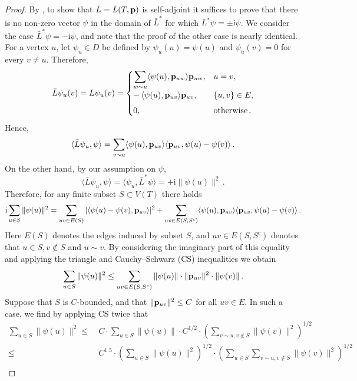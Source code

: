\documentclass[10pt,a4paper]{amsart}
\numberwithin{equation}{section}
\newcommand{\ii}{\mathrm{i}}
\newcommand{\p}{{\bf p}}
\begin{document}
\begin{proof}
    By \cite[Theorem VIII.3]{ReedSimonI}, to show that $\bar L=\bar L(T,\p)$ is self-adjoint it suffices to prove that there is no non-zero vector $\psi$ in the domain of $\bar L^*$ for which $L^*\psi=\pm \ii\psi$. We consider the case $\bar L^*\psi=-\ii\psi$, and note that the proof of the other case is nearly identical. For a vertex $u$, let $\psi_u\in D$ be defined by $\psi_u(u)=\psi(u)$ and $\psi_u(v)=0$ for every $v\ne u$. Therefore,
    \[
        \bar L\psi_u(v) = L\psi_u(v) =
        \begin{cases}
        \displaystyle \sum_{w\sim u} \langle \psi(u),\p_{uw}\rangle\p_{uw}, & u=v,\\[1ex]
        \displaystyle -\,\langle \psi(u),\p_{uv}\rangle\p_{uv}, & \{u,v\}\in E,\\[1ex]
        0, & \text{otherwise}\,.
        \end{cases}
    \]
    Hence,
    \[
        \langle \bar L\psi_u,\psi\rangle =\sum_{v\sim u}\langle\psi(u),\p_{uv}\rangle\langle\p_{uv},\psi(u)-\psi(v)\rangle\,. 
    \]
    On the other hand, by our assumption on $\psi$,
    \[
        \langle \bar L\psi_u,\psi\rangle = \langle \psi_u,\bar L^*\psi \rangle = +\ii\|\psi(u)\|^2\,.
    \]    
    Therefore, for any finite subset $S\subset V(T)$ there holds
    \[
        \ii\sum_{u\in S}\|\psi(u)\|^2 =
        \sum_{uv\in E(S)}|\langle\psi(u)-\psi(v),\p_{uv}\rangle|^2
        +\sum_{uv\in E(S,S^c)}\langle\psi(u),\p_{uv}\rangle\langle\p_{uv},\psi(u)-\psi(v)\rangle\,. 
        \]
        Here $E(S)$ denotes the edges induced by subset $S$, and $uv\in E(S,S^c)$ denotes that $u\in S,v\notin S$ and $u\sim v$. By considering the imaginary part of this equality and applying the triangle and Cauchy--Schwarz (CS) inequalities we obtain 
        \begin{equation}\label{eq:sa_norm}
        \sum_{u\in S}\|\psi(u)\|^2 \leq
        \sum_{uv\in E(S,S^c)} \|\psi(u)\|\cdot \|\p_{uv}\|^2\cdot \|\psi(v)\|\,.
        \end{equation}
        Suppose that $S$ is $C$-bounded, and that $\|\p_{uv}\|^2\le C$ for all $uv\in E$. In such a case, we find by applying CS twice that
        \begin{align*}
            \sum_{u\in S}\|\psi(u)\|^2 
            \leq ~&C\cdot \sum_{u\in S} \|\psi(u)\|\cdot C^{1/2}\cdot\left(\sum_{v\sim u,v\notin S}\|\psi(v)\|^2\right)^{1/2}\\
            \leq~
            &C^{1.5}\cdot \left(\sum_{u\in S} \|\psi(u)\|^2\right)^{1/2}\cdot\left(\sum_{u\in S}\sum_{v\sim u,v\notin S}\|\psi(v)\|^2\right)^{1/2} \\

\end{align*}
\end{proof}
\end{document}
